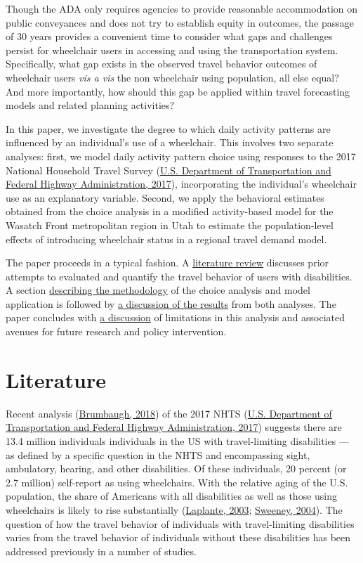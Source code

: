 \documentclass[3p, authoryear, review]{elsarticle} %
\begin{document}
Though the ADA only requires agencies to provide reasonable accommodation on
public conveyances and does not try to establish equity in outcomes, the passage
of 30 years provides a convenient time to consider what gaps and challenges
persist for wheelchair users in accessing and using the transportation system.
Specifically, what gap exists in the observed travel behavior outcomes of
wheelchair users \emph{vis a vis} the non wheelchair using population, all else equal?
And more importantly, how should this gap be applied within travel forecasting
models and related planning activities?

In this paper, we investigate the degree to which daily activity patterns are
influenced by an individual's use of a wheelchair. This involves two separate
analyses: first, we model daily activity pattern choice using responses to the
2017 National Household Travel Survey (\protect\hyperlink{ref-fhwa2017}{U.S. Department of Transportation and Federal Highway Administration, 2017}), incorporating the individual's
wheelchair use as an explanatory variable. Second, we apply the behavioral
estimates obtained from the choice analysis in a modified activity-based model
for the Wasatch Front metropolitan region in Utah to estimate the
population-level effects of introducing wheelchair status in a regional travel
demand model.

The paper proceeds in a typical fashion. A \protect\hyperlink{literature}{literature review}
discusses prior attempts to evaluated and quantify the travel behavior of
users with disabilities. A section \protect\hyperlink{methodology}{describing the methodology}
of the choice analysis and model application is followed by \protect\hyperlink{results}{a discussion of the results}
from both analyses. The paper concludes with \protect\hyperlink{discussion}{a discussion}
of limitations in this analysis and associated avenues for future research and
policy intervention.

\hypertarget{sec-literature}{%
\section{Literature}\label{sec-literature}}

Recent analysis (\protect\hyperlink{ref-Brumbaugh2018}{Brumbaugh, 2018}) of the 2017 NHTS (\protect\hyperlink{ref-fhwa2017}{U.S. Department of Transportation and Federal Highway Administration, 2017}) suggests there are 13.4
million individuals individuals in the US with travel-limiting disabilities --- as defined by a
specific question in the NHTS and encompassing sight, ambulatory, hearing, and
other disabilities. Of these individuals, 20 percent (or 2.7
million) self-report as using wheelchairs. With the relative aging of the U.S.
population, the share of Americans with all disabilities as well as those using
wheelchairs is likely to rise substantially (\protect\hyperlink{ref-Laplante2003}{Laplante, 2003}; \protect\hyperlink{ref-Sweeney2004}{Sweeney, 2004}).
The question of how the travel behavior of individuals with travel-limiting
disabilities varies from the travel behavior of individuals without these
disabilities has been addressed previously in a number of studies.
\end{document}

